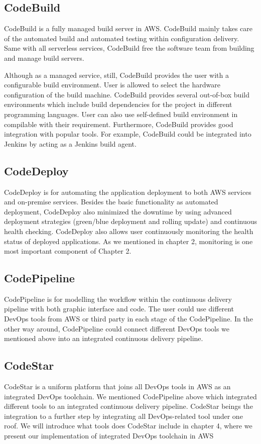 \subsection{CodeBuild}
CodeBuild is a fully managed build server in AWS. CodeBuild mainly takes care of the automated build and automated testing within configuration delivery. Same with all serverless services, CodeBuild free the software team from building and manage build servers.
\par
Although as a managed service, still, CodeBuild provides the user with a configurable build environment. User is allowed to select the hardware configuration of the build machine. CodeBuild provides several out-of-box build environments which include build dependencies for the project in different programming languages. User can also use self-defined build environment in compilable with their requirement.
Furthermore, CodeBuild provides good integration with popular tools. For example, CodeBuild could be integrated into Jenkins by acting as a Jenkins build agent.
\subsection{CodeDeploy}
CodeDeploy is for automating the application deployment to both AWS services and on-premise services. 
Besides the basic functionality as automated deployment, CodeDeploy also minimized the downtime by using advanced deployment strategies (green/blue deployment and rolling update) and continuous health checking. 
CodeDeploy also allows user continuously monitoring the health status of deployed applications. As we mentioned in chapter 2, monitoring is one most important component of Chapter 2.
\subsection{CodePipeline}
CodePipeline is for modelling the workflow within the continuous delivery pipeline with both graphic interface and code. The user could use different DevOps tools from AWS or third party in each stage of the CodePipeline. In the other way around, CodePipeline could connect different DevOps tools we mentioned above into an integrated continuous delivery pipeline.
\subsection{CodeStar}
CodeStar is a uniform platform that joins all DevOps tools in AWS as an integrated DevOps toolchain. We mentioned CodePipeline above which integrated different tools to an integrated continuous delivery pipeline. CodeStar beings the integration to a further step by integrating all DevOps-related tool under one roof. We will introduce what tools does CodeStar include in chapter 4, where we present our implementation of integrated DevOps toolchain in AWS